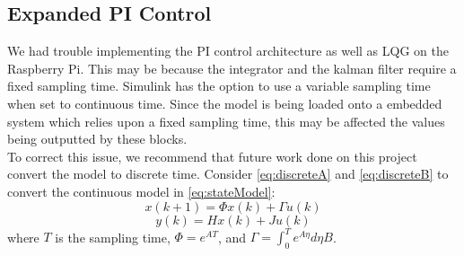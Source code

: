 \subsection{Expanded PI Control}
We had trouble implementing the PI control architecture as well as LQG on the Raspberry Pi. This may be because the integrator and the kalman filter require a fixed sampling time.  Simulink has the option to use a variable sampling time when set to continuous time.  Since the model is being loaded onto a embedded system which relies upon a fixed sampling time, this may be affected the values being outputted by these blocks.\\
To correct this issue, we recommend that future work done on this project convert the model to discrete time.  Consider \ref{eq:discreteA} and \ref{eq:discreteB} to convert the continuous model in \ref{eq:stateModel}:
\begin{equation}
\label{eq:discreteA}
    x(k+1)=\Phi x(k)+\Gamma u(k)
\end{equation}
\begin{equation}
\label{eq:discreteB}
    y(k)=Hx(k)+Ju(k)
\end{equation}
where $T$ is the sampling time, $\Phi=e^{AT}$, and $\Gamma=\int_0^T e^{A\eta} d\eta B$.



